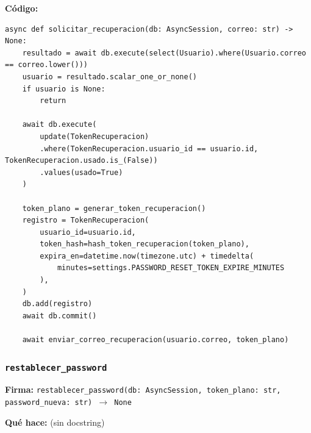 \documentclass[11pt,a4paper]{article}
\begin{document}
\textbf{Código:}
\begin{lstlisting}
async def solicitar_recuperacion(db: AsyncSession, correo: str) -> None:
    resultado = await db.execute(select(Usuario).where(Usuario.correo == correo.lower()))
    usuario = resultado.scalar_one_or_none()
    if usuario is None:
        return

    await db.execute(
        update(TokenRecuperacion)
        .where(TokenRecuperacion.usuario_id == usuario.id, TokenRecuperacion.usado.is_(False))
        .values(usado=True)
    )

    token_plano = generar_token_recuperacion()
    registro = TokenRecuperacion(
        usuario_id=usuario.id,
        token_hash=hash_token_recuperacion(token_plano),
        expira_en=datetime.now(timezone.utc) + timedelta(
            minutes=settings.PASSWORD_RESET_TOKEN_EXPIRE_MINUTES
        ),
    )
    db.add(registro)
    await db.commit()

    await enviar_correo_recuperacion(usuario.correo, token_plano)
\end{lstlisting}

\subsubsection*{\texttt{restablecer\_password}}
\textbf{Firma:} \texttt{restablecer\_password(db: AsyncSession, token\_plano: str, password\_nueva: str) $\rightarrow$ None}

\textbf{Qué hace:} (sin docstring)
\end{document}
